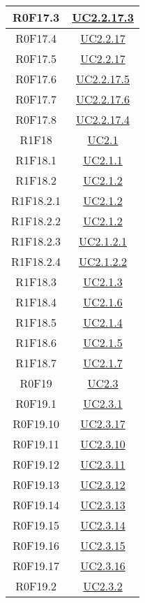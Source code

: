 \documentclass[../AnalisiDeiRequisiti.tex]{subfiles}
\begin{document}
\begin{longtable}{|c|c|}
	R0F17.3 & \hyperlink{UC2.2.17.3}{UC2.2.17.3}\\\hline
	R0F17.4 & \hyperlink{UC2.2.17}{UC2.2.17}\\\hline
	R0F17.5 & \hyperlink{UC2.2.17}{UC2.2.17}\\\hline
	R0F17.6 & \hyperlink{UC2.2.17.5}{UC2.2.17.5}\\\hline
	R0F17.7 & \hyperlink{UC2.2.17.6}{UC2.2.17.6}\\\hline
	R0F17.8 & \hyperlink{UC2.2.17.4}{UC2.2.17.4}\\\hline
	R1F18 & \hyperlink{UC2.1}{UC2.1}\\\hline
	R1F18.1 & \hyperlink{UC2.1.1}{UC2.1.1}\\\hline
	R1F18.2 & \hyperlink{UC2.1.2}{UC2.1.2}\\\hline
	R1F18.2.1 & \hyperlink{UC2.1.2}{UC2.1.2}\\\hline
	R1F18.2.2 & \hyperlink{UC2.1.2}{UC2.1.2}\\\hline
	R1F18.2.3 & \hyperlink{UC2.1.2.1}{UC2.1.2.1}\\\hline
	R1F18.2.4 & \hyperlink{UC2.1.2.2}{UC2.1.2.2}\\\hline
	R1F18.3 & \hyperlink{UC2.1.3}{UC2.1.3}\\\hline
	R1F18.4 & \hyperlink{UC2.1.6}{UC2.1.6}\\\hline
	R1F18.5 & \hyperlink{UC2.1.4}{UC2.1.4}\\\hline
	R1F18.6 & \hyperlink{UC2.1.5}{UC2.1.5}\\\hline
	R1F18.7 & \hyperlink{UC2.1.7}{UC2.1.7}\\\hline
	R0F19 & \hyperlink{UC2.3}{UC2.3}\\\hline
	R0F19.1 & \hyperlink{UC2.3.1}{UC2.3.1}\\\hline
	R0F19.10 & \hyperlink{UC2.3.17}{UC2.3.17}\\\hline
	R0F19.11 & \hyperlink{UC2.3.10}{UC2.3.10}\\\hline
	R0F19.12 & \hyperlink{UC2.3.11}{UC2.3.11}\\\hline
	R0F19.13 & \hyperlink{UC2.3.12}{UC2.3.12}\\\hline
	R0F19.14 & \hyperlink{UC2.3.13}{UC2.3.13}\\\hline
	R0F19.15 & \hyperlink{UC2.3.14}{UC2.3.14}\\\hline
	R0F19.16 & \hyperlink{UC2.3.15}{UC2.3.15}\\\hline
	R0F19.17 & \hyperlink{UC2.3.16}{UC2.3.16}\\\hline
	R0F19.2 & \hyperlink{UC2.3.2}{UC2.3.2}\\\hline

\end{longtable}
\end{document}
